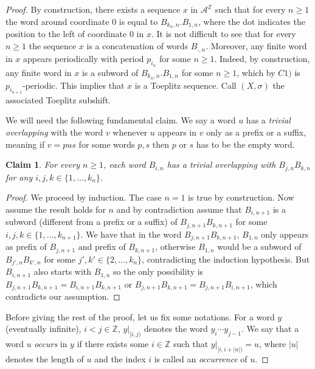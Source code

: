 \documentclass{daj}
\theoremstyle{plain}
\newtheorem{claim}[theorem]{Claim}
\theoremstyle{definition}
\begin{document}
\begin{proof}
	By construction, there exists a sequence $x$ in ${\mathcal A}^\mathbb{Z}$ such that   
	for every $n\geq 1$ the word around coordinate 0 is equal to $B_{k_n,n}.B_{1,n}$, where the dot indicates the position to the left of coordinate 0 in $x$. It is not difficult to see that for every $n\ge 1$ the sequence $x$ is a concatenation of words $B_{\cdot, n}$. Moreover, any finite word in $x$ appears periodically with period $p_{i_n}$ for some $n\geq 1$. Indeed, by construction, any finite word in $x$ is a subword of  
	$B_{k_n,n}.B_{1,n}$ for some $n\geq 1$, which by $C1)$ is $p_{i_{n+1}}$-periodic. This implies that $x$ is a Toeplitz sequence. Call $(X,\sigma )$ the associated Toeplitz subshift. 
	
	We will need the following fundamental claim. We say  a word $u$ has a {\em trivial overlapping} with  the word $v$ whenever $u$ appears in $v$ only as a prefix or a suffix, meaning  
	if $v= pus$ for some words $p,s$ then $p$ or $s$ has to be the empty word. 
	
	\begin{claim}\label{claim:overlapping}
		For every $n\geq 1$, each word $B_{i,n}$  has a trivial overlapping with $B_{j,n}B_{k,n}$ for any $i,j,k \in \{1,\ldots,k_n\}$.
		
	\end{claim}
	\begin{proof}
		
		We proceed by induction. The case $n=1$ is true by construction. Now assume the result holds for $n$ and by contradiction assume that $B_{i,n+1}$ is a subword (different from a prefix or a suffix) of $B_{j,n+1}B_{k,n+1}$ for some  $i,j,k \in \{1,\ldots,k_{n+1}\}$.  
		We have that in the word $B_{j,n+1}B_{k,n+1}$, $B_{1,n}$ only appears as prefix of $B_{j,n+1}$ and prefix of $B_{k,n+1}$, otherwise $B_{1,n}$  would be a subword of $B_{j',n}B_{k',n}$ for some $j',k' \in \{2,\ldots,k_n\}$, contradicting the induction hypothesis. But $B_{i,n+1}$ also starts with $B_{1,n}$ so the only possibility is $B_{j,n+1}B_{k,n+1}=B_{i,n+1}B_{k,n+1}$ or $B_{j,n+1}B_{k,n+1}=B_{j,n+1}B_{i,n+1}$, which contradicts our assumption.   	
	\end{proof}
	
	Before giving the rest of the proof, let us fix some notations. For a word $y$ (eventually infinite), $i<j \in \mathbb{Z}$, $y|_{[i,j)}$ denotes the word $y_{i}\cdots y_{j-1}$. 
	We say that  a word $u$ {\em occurs} in $y$ if there exists some $i\in \mathbb{Z}$ such that $y|_{[i, i+|u|)} =u$, where $|u|$ denotes the length of $u$ and the index $i$ is called an {\em occurrence} of $u$.       
	

\end{proof}
\end{document}
